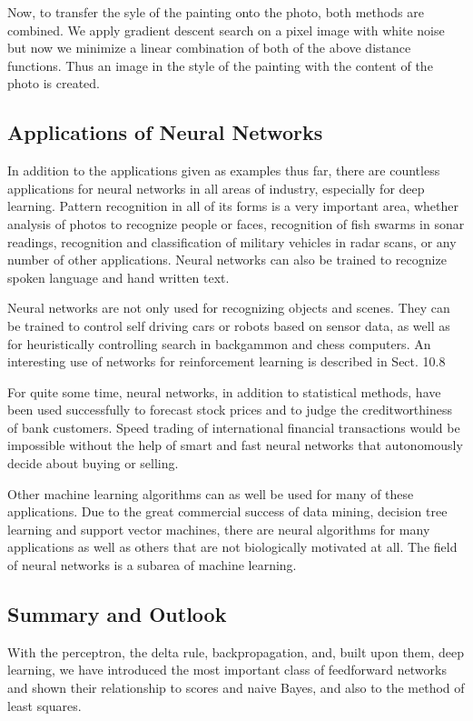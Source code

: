 \documentclass[10pt]{article}
\begin{document}
Now, to transfer the syle of the painting onto the photo, both methods are combined. We apply gradient descent search on a pixel image with white noise but now we minimize a linear combination of both of the above distance functions. Thus an image in the style of the painting with the content of the photo is created.

\subsection*{Applications of Neural Networks}
In addition to the applications given as examples thus far, there are countless applications for neural networks in all areas of industry, especially for deep learning. Pattern recognition in all of its forms is a very important area, whether analysis of photos to recognize people or faces, recognition of fish swarms in sonar readings, recognition and classification of military vehicles in radar scans, or any number of other applications. Neural networks can also be trained to recognize spoken language and hand written text.

Neural networks are not only used for recognizing objects and scenes. They can be trained to control self driving cars or robots based on sensor data, as well as for heuristically controlling search in backgammon and chess computers. An interesting use of networks for reinforcement learning is described in Sect. 10.8

For quite some time, neural networks, in addition to statistical methods, have been used successfully to forecast stock prices and to judge the creditworthiness of bank customers. Speed trading of international financial transactions would be impossible without the help of smart and fast neural networks that autonomously decide about buying or selling.

Other machine learning algorithms can as well be used for many of these applications. Due to the great commercial success of data mining, decision tree learning and support vector machines, there are neural algorithms for many applications as well as others that are not biologically motivated at all. The field of neural networks is a subarea of machine learning.

\subsection*{Summary and Outlook}
With the perceptron, the delta rule, backpropagation, and, built upon them, deep learning, we have introduced the most important class of feedforward networks and shown their relationship to scores and naive Bayes, and also to the method of least squares.
\end{document}
